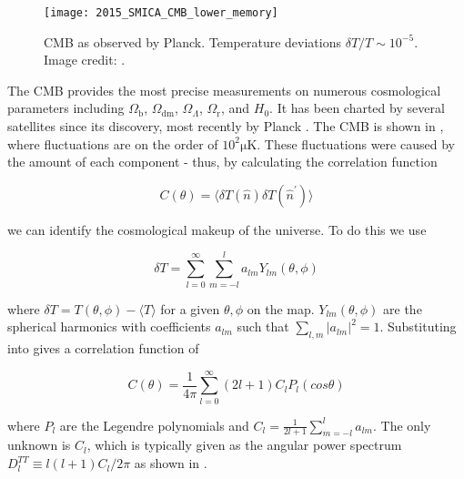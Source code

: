 \begin{figure}
\centering
\texttt{[image: 2015\_SMICA\_CMB\_lower\_memory]}
\caption{CMB as observed by Planck.  Temperature deviations $\delta T/T \sim 10^{-5}$.  Image credit: .}
\label{fig:planck_map}
\end{figure}


The CMB provides the most precise measurements on numerous cosmological parameters including $\Omega_{\mathrm{b}}$,
$\Omega_{\mathrm{dm}}$, $\Omega_{\Lambda}$, $\Omega_{\mathrm{r}}$, and $H_{0}$.  It has been charted by several satellites since
its
discovery, most recently by Planck .  The CMB is shown in ,
where fluctuations are on the order of $10^{2} \mathrm{\mu K}$.  These fluctuations were caused by the
amount of each component - thus, by calculating the correlation function

\vspace{-5pt}

\begin{equation}
C(\theta) = \Big \langle \delta T( \hat{n}) \delta T(\hat{n}^\prime) \Big \rangle
\label{eq:cmb_corr_func}
\end{equation}

\noindent we can identify the cosmological makeup of the universe.  To do this we use

\begin{equation}
\delta T = \sum\limits_{l=0}^{\infty} \sum\limits_{m=-l}^{l} a_{lm}Y_{lm}(\theta, \phi)
\label{eq:cmb_delta_t}
\end{equation}

\noindent where $\delta T = T(\theta, \phi) - \langle T \rangle$ for a given $\theta , \phi$
on the map.  $Y_{lm}(\theta, \phi)$ are the spherical harmonics with coefficients $a_{lm}$
such that $\sum\limits_{l,m} |a_{lm}|^{2} = 1$.  Substituting  into  gives a correlation
function of

\begin{equation}
C(\theta) = \frac{1}{4 \pi} \sum\limits_{l=0}^{\infty} (2l + 1) C_{l} P_{l}(cos \theta)
\end{equation}

\noindent where $P_{l}$ are the Legendre polynomials and $C_{l} = \frac{1}{2l + 1} \sum\limits_{m=-l}^{l} a_{lm}$.  The
only unknown is $C_{l}$, which is typically given as the angular power spectrum
$D_{l}^{TT} \equiv l(l+1)C_{l}/2\pi$ as shown in .

